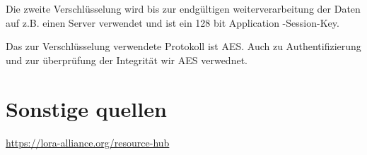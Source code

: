 \documentclass[a4paper,12pt]{article}
\begin{document}
    Die zweite Verschlüsselung wird bis zur endgültigen weiterverarbeitung der Daten auf z.B. einen Server verwendet und ist ein 128 bit Application -Session-Key.

    Das zur Verschlüsselung verwendete Protokoll ist AES. Auch zu Authentifizierung und zur überprüfung der Integrität wir AES verwednet.
    \cite{LoRaSecur}
        \cite{RFC8376}
        \cite{WhatIsLoRa}
    \section{Sonstige quellen}
    \url{https://lora-alliance.org/resource-hub}

    \newpage
    
    
\end{document}
